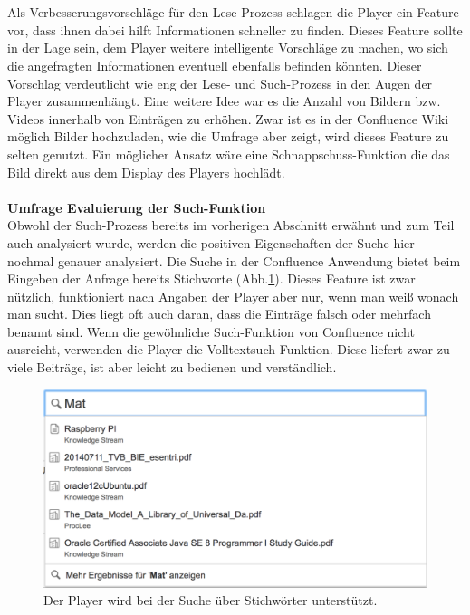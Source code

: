 \documentclass[a4paper,12pt]{scrartcl}
\begin{document}
\\\\
Als Verbesserungsvorschläge für den Lese-Prozess schlagen die Player ein Feature vor, dass ihnen dabei hilft Informationen schneller zu finden. Dieses Feature sollte in der Lage sein, dem Player weitere intelligente Vorschläge zu machen, wo sich die angefragten Informationen eventuell ebenfalls befinden könnten. Dieser Vorschlag verdeutlicht wie eng der Lese- und Such-Prozess in den Augen der Player zusammenhängt. Eine weitere Idee war es die Anzahl von Bildern bzw. Videos innerhalb von Einträgen zu erhöhen. Zwar ist es in der Confluence Wiki möglich Bilder hochzuladen, wie die Umfrage aber zeigt, wird dieses Feature zu selten genutzt. Ein möglicher Ansatz wäre eine Schnappschuss-Funktion die das Bild direkt aus dem Display des Players hochlädt.
\\\\
\textbf{Umfrage Evaluierung der Such-Funktion}\\
Obwohl der Such-Prozess bereits im vorherigen Abschnitt erwähnt und zum Teil auch analysiert wurde, werden die positiven Eigenschaften der Suche hier nochmal genauer analysiert. Die Suche in der Confluence Anwendung bietet beim Eingeben der Anfrage bereits Stichworte (Abb.\ref{Sucheingabe}). Dieses Feature ist zwar nützlich, funktioniert nach Angaben der Player aber nur, wenn man weiß wonach man sucht. Dies liegt oft auch daran, dass die Einträge falsch oder mehrfach benannt sind. Wenn die gewöhnliche Such-Funktion von Confluence nicht ausreicht, verwenden die Player die Volltextsuch-Funktion. Diese liefert zwar zu viele Beiträge, ist aber leicht zu bedienen und verständlich.
\\
\begin{figure}[h!]
\begin{center}
\includegraphics[scale = 0.4]{Bilder/Sucheingabe.eps}
\caption{Der Player wird bei der Suche über Stichwörter unterstützt.}
\label{Sucheingabe}
\end{center}
\end{figure}
\end{document}
